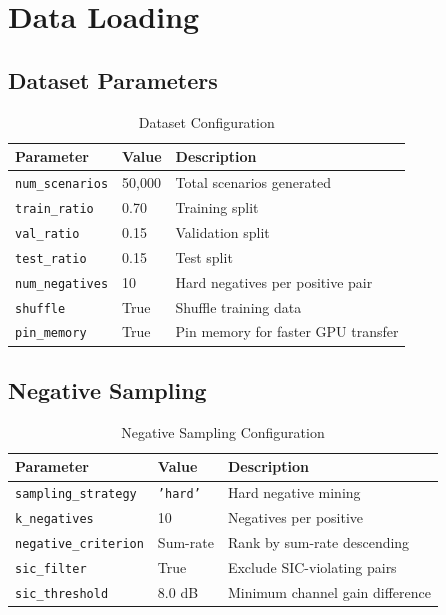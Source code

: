 \section{Data Loading}

\subsection{Dataset Parameters}

\begin{table}[H]
\centering
\begin{tabular}{llp{7cm}}
\toprule
\textbf{Parameter} & \textbf{Value} & \textbf{Description} \\
\midrule
\texttt{num\_scenarios} & 50,000 & Total scenarios generated \\
\texttt{train\_ratio} & 0.70 & Training split \\
\texttt{val\_ratio} & 0.15 & Validation split \\
\texttt{test\_ratio} & 0.15 & Test split \\
\texttt{num\_negatives} & 10 & Hard negatives per positive pair \\
\texttt{shuffle} & True & Shuffle training data \\
\texttt{pin\_memory} & True & Pin memory for faster GPU transfer \\
\bottomrule
\end{tabular}
\caption{Dataset Configuration}
\end{table}

\subsection{Negative Sampling}

\begin{table}[H]
\centering
\begin{tabular}{llp{7cm}}
\toprule
\textbf{Parameter} & \textbf{Value} & \textbf{Description} \\
\midrule
\texttt{sampling\_strategy} & \texttt{'hard'} & Hard negative mining \\
\texttt{k\_negatives} & 10 & Negatives per positive \\
\texttt{negative\_criterion} & Sum-rate & Rank by sum-rate descending \\
\texttt{sic\_filter} & True & Exclude SIC-violating pairs \\
\texttt{sic\_threshold} & 8.0 dB & Minimum channel gain difference \\
\bottomrule
\end{tabular}
\caption{Negative Sampling Configuration}
\end{table}


